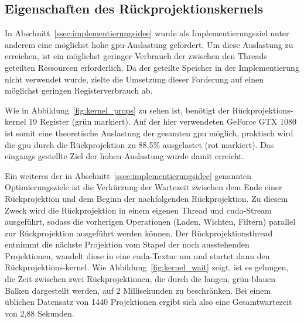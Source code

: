 \subsection{Eigenschaften des Rückprojektionskernels}

In Abschnitt~\ref{ssec:implementierungsidee} wurde als Implementierungsziel unter anderem eine möglichst hohe
\gls{gpu}-Auslastung gefordert. Um diese Auslastung zu erreichen, ist ein möglichst geringer Verbrauch der zwischen den
Threads geteilten Ressourcen erforderlich. Da der geteilte Speicher in der Implementierung nicht verwendet wurde, zielte
die Umsetzung dieser Forderung auf einen möglichst geringen Registerverbrauch ab.

Wie in Abbildung~\ref{fig:kernel_props} zu sehen ist, benötigt der Rückprojektions-\gls{kernel} 19 Register
(grün markiert). Auf der hier verwendeten GeForce GTX 1080 ist somit eine theoretische Auslastung der gesamten \gls{gpu}
möglich, praktisch wird die \gls{gpu} durch die Rückprojektion zu 88,5\% ausgelastet (rot markiert). Das eingangs
gestellte Ziel der hohen Auslastung wurde damit erreicht.

Ein weiteres der in Abschnitt~\ref{ssec:implementierungsidee} genannten Optimierungsziele ist die Verkürzung der
Wartezeit zwischen dem Ende einer Rückprojektion und dem Beginn der nachfolgenden Rückprojektion. Zu diesem Zweck wird
die Rückprojektion in einem eigenen Thread und \gls{cuda}-Stream ausgeführt, sodass die vorherigen Operationen (Laden,
Wichten, Filtern) parallel zur Rückprojektion ausgeführt werden können. Der Rückprojektionsthread entnimmt die nächste
Projektion vom Stapel der noch ausstehenden Projektionen, wandelt diese in eine \gls{cuda}-Textur um und startet dann
den Rückprojektions-\gls{kernel}. Wie Abbildung~\ref{fig:kernel_wait} zeigt, ist es gelungen, die Zeit zwischen zwei
Rückprojektionen, die durch die langen, grün-blauen Balken dargestellt werden, auf 2 Millisekunden zu beschränken. Bei
einem üblichen Datensatz von 1440 Projektionen ergibt sich also eine Gesamtwartezeit von 2,88 Sekunden.

